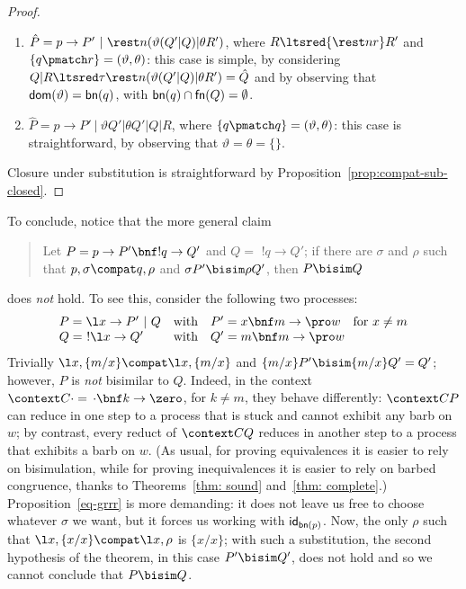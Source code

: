 \documentclass{LMCS}
\begin{document}
\begin{proof}
\begin{enumerate}
\begin{enumerate}[label=\({\alph*}]
	\item $\hat P = p \to P'\ |\ \rest n(\vartheta (Q'|Q)|\theta R')$, where $R \ltsred{\rest n r} R'$ and 
	$\{q\pmatch r\} = \linebreak (\vartheta,\theta)$: this case is simple, by considering 
	$Q|R \ltsred\tau \linebreak \rest n(\vartheta (Q'|Q)|\theta R') = \hat Q$ and by observing that 
	${\sf dom}(\vartheta) = {\sf bn}(q)$, with ${\sf bn}(q) \cap {\sf fn}(Q) = \emptyset$.

	\item $\hat P = p \to P'\ |\ \vartheta Q'|\theta Q'|Q|R$, where $\{q\pmatch q\} = (\vartheta,\theta)$:
	this case is straightforward, by observing that $\vartheta = \theta = \{\}$.
	\end{enumerate}
\end{enumerate}
Closure under substitution is straightforward by Proposition~\ref{prop:compat-sub-closed}.
\end{proof}

To conclude, notice that the more general claim
\begin{quote}
Let $P=p\to P'\bnf !q\to Q'$ and $Q= \,\,!q\to Q'$; if there are $\sigma$
and $\rho$ such that $p,\sigma\compat q,\rho$ and
$\sigma P'\bisim\rho Q'$, then $P\bisim Q$
\end{quote}
does {\em not} hold. To see this, consider the following two processes:
$$
\begin{array}{lll}
P = \l x \to P'\ |\ Q & \mbox{with} & P' =  x\bnf m \to \pro w
\ \ \mbox{ for } x \neq m
\\
Q =\,\, !\l x \to Q' & \mbox{with} & Q' = m\bnf m \to \pro w
\end{array}
$$
Trivially $\l x, \{m/x\} \compat \l x, \{m/x\}$ and $\{m/x\}P' \bisim \{m/x\}Q' = Q'$;
however, $P$ is {\em not} bisimilar to $Q$. Indeed, in the context $\context C \cdot = \,\cdot\bnf k \to \zero$,
for $k \neq m$, they behave differently: $\context C P$ can reduce in one step to a process that is stuck and cannot
exhibit any barb on $w$; by contrast, every reduct of $\context C Q$ reduces in another step to a process that exhibits
a barb on $w$. (As usual, for proving equivalences it is easier to rely on bisimulation, while for proving
inequivalences it is easier to rely on barbed congruence, thanks to Theorems~\ref{thm: sound} and~\ref{thm: complete}.)
Proposition~\ref{eq-grrr} is more demanding: it does not leave us free to choose whatever $\sigma$ we want, but
it forces us working with ${\sf id}_{{\sf bn}(p)}$. Now, the only $\rho$ such that $\l x,\{x/x\} \compat \l x,\rho$
is $\{x/x\}$; with such a substitution, the second hypothesis of the theorem, in this case $P' \bisim Q'$, does not hold
and so we cannot conclude that $P \bisim Q$.
\end{document}
